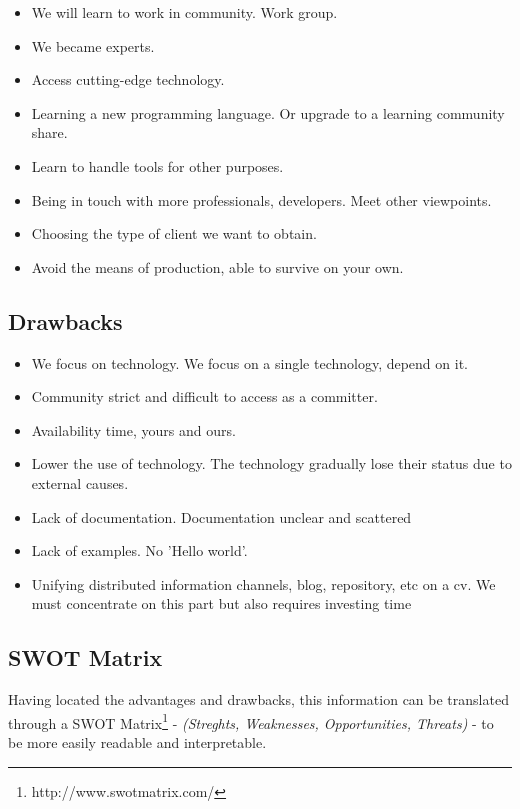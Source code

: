 \documentclass[11pt]{scrartcl}
\begin{document}
\begin{itemize}
    \item We will learn to work in community. Work group.
    \item We became experts.
    \item Access cutting-edge technology.
    \item Learning a new programming language. Or upgrade to a learning community share.
    \item Learn to handle tools for other purposes.
    \item Being in touch with more professionals, developers. Meet other viewpoints.
    \item Choosing the type of client we want to obtain.
    \item Avoid the means of production, able to survive on your own.
\end{itemize}

\subsection{Drawbacks}

\begin{itemize}
    \item We focus on technology. We focus on a single technology, depend on it.
    \item Community strict and difficult to access as a committer.
    \item Availability time, yours and ours. 
    \item Lower the use of technology. The technology gradually lose their status due to external causes.
    \item Lack of documentation. Documentation unclear and scattered
    \item Lack of examples. No 'Hello world'.
    \item Unifying distributed information channels, blog, repository, etc on a cv. We must concentrate on this part but also requires investing time
\end{itemize}

\subsection{SWOT Matrix}

\par Having located the advantages and drawbacks, this information can be translated through a SWOT Matrix\footnote{http://www.swotmatrix.com/} - \emph{(Streghts, Weaknesses, Opportunities, Threats)} - to be more easily readable and interpretable.
\end{document}
